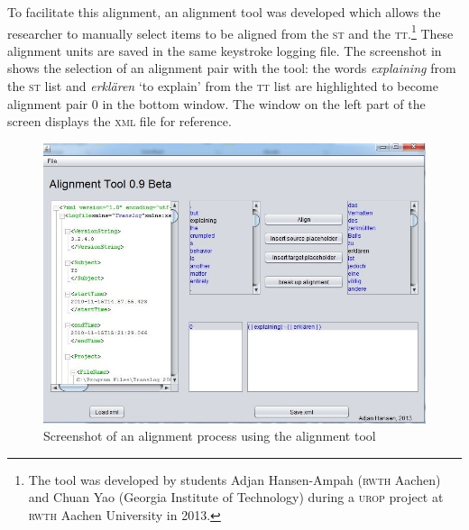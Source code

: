 \documentclass[output=paper]{LSP/langsci}
\begin{document}
To facilitate this alignment, an alignment tool was developed which allows the researcher to manually select items to be aligned from the \textsc{st} and the \textsc{tt}.\footnote{The tool was developed by students Adjan Hansen-Ampah (\textsc{rwth} Aachen) and Chuan Yao (Georgia Institute of Technology) during a \textsc{urop} project at \textsc{rwth} Aachen University in 2013.} These alignment units are saved in the same keystroke logging file. The screenshot in  shows the selection of an alignment pair with the tool: the words \textit{explaining }from the \textsc{st} list and \textit{erklären} `to explain' from the \textsc{tt} list are highlighted to become alignment pair 0 in the bottom window. The window on the left part of the screen displays the \textsc{xml} file for reference.


\begin{figure}
\includegraphics[width=.7\textwidth]{./figures/2-1.jpg}
\caption{Screenshot of an alignment process using the alignment tool} \label{fig:1:1}
\end{figure}
\end{document}
